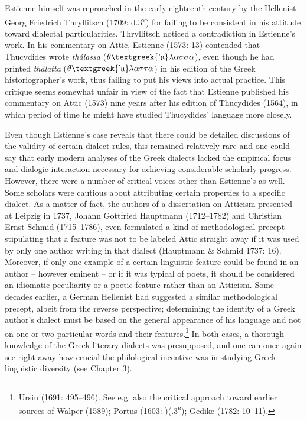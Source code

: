 \begin{styleStandard}
Estienne himself was reproached in the early eighteenth century by the Hellenist Georg Friedrich Thryllitsch (1709: d.3\textsuperscript{v}) for failing to be consistent in his attitude toward dialectal particularities. Thryllitsch noticed a contradiction in Estienne’s work. In his commentary on Attic, Estienne (1573: 13) contended that Thucydides wrote \textit{thálassa} ($\theta \text{\textgreek{'a}}\lambda \alpha \sigma \sigma \alpha $), even though he had printed \textit{thálatta} ($\theta \text{\textgreek{'a}}\lambda \alpha \tau \tau \alpha $) in his edition of the Greek historiographer’s work, thus failing to put his views into actual practice. This critique seems somewhat unfair in view of the fact that Estienne published his commentary on Attic (1573) nine years after his edition of Thucydides (1564), in which period of time he might have studied Thucydides’ language more closely.
\end{styleStandard}

\begin{styleStandard}
Even though Estienne’s case reveals that there could be detailed discussions of the validity of certain dialect rules, this remained relatively rare and one could say that early modern analyses of the Greek dialects lacked the empirical focus and dialogic interaction necessary for achieving considerable scholarly progress. However, there were a number of critical voices other than Estienne’s as well. Some scholars were cautious about attributing certain properties to a specific dialect. As a matter of fact, the authors of a dissertation on Atticism presented at Leipzig in 1737, Johann Gottfried Hauptmann (1712–1782) and Christian Ernst Schmid (1715–1786), even formulated a kind of methodological precept stipulating that a feature was not to be labeled Attic straight away if it was used by only one author writing in that dialect (Hauptmann \& Schmid 1737: 16). Moreover, if only one example of a certain linguistic feature could be found in an author – however eminent – or if it was typical of poets, it should be considered an idiomatic peculiarity or a poetic feature rather than an Atticism. Some decades earlier, a German Hellenist had suggested a similar methodological precept, albeit from the reverse perspective; determining the identity of a Greek author’s dialect must be based on the general appearance of his language and not on one or two particular words and their features.\footnote{ Ursin (1691: 495–496). See e.g. also the critical approach toward earlier sources of Walper (1589); Portus (1603: )(.3\textsc{\textsuperscript{r}}); Gedike (1782: 10–11).} In both cases, a thorough knowledge of the Greek literary dialects was presupposed, and one can once again see right away how crucial the philological incentive was in studying Greek linguistic diversity (see Chapter 3).
\end{styleStandard}

